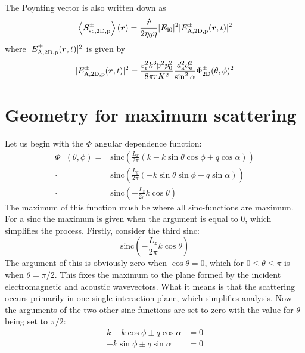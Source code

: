 \documentclass[11pt,twoside]{eitExjobb}
\begin{document}
	The Poynting vector is also written down as
	\begin{equation*}
		\left< \bm{S}_{\mathrm{sc,2D,p}}^\pm \right> (\bm{r}) = \frac{\bm{\hat{r}}}{2\eta_0 \eta} |\bm{E}_{\mathrm{i}0}|^2 |E_{\mathrm{A,2D,p}}^\pm (\bm{r},t)|^2
	\end{equation*}
	where $|E_{\mathrm{A,2D,p}}^\pm (\bm{r},t)|^2$ is given by
	\begin{equation*}
		|E_{\mathrm{A,2D,p}}^\pm (\bm{r},t)|^2 = \frac{\varepsilon_{\mathrm{r}}^2 k^3 \mathfrak{p}^2 p_0^2}{8\pi r K^2} \frac{d_{\mathrm{a}}^2 d_{\mathrm{e}}^2}{\sin^2{\alpha}} \Phi_{\mathrm{2D}}^\pm (\theta,\phi)^2
	\end{equation*}
	
	\section{Geometry for maximum scattering \label{sec:app-derivations-bragg}}
	Let us begin with the $\Phi$ angular dependence function:
	\begin{equation*}
	\begin{split}
		\Phi^\pm(\theta,\phi) =& \text{sinc} \left( \frac{L_{x}}{2\pi} \left( k - k\sin{\theta}\cos{\phi} \pm q\cos{\alpha} \right) \right) \\
		\cdot& \text{sinc} \left( \frac{L_{y}}{2\pi} \left( -k\sin{\theta}\sin{\phi} \pm q\sin{\alpha} \right) \right) \\
		\cdot& \text{sinc} \left( -\frac{L_{z}}{2\pi} k\cos{\theta} \right)
	\end{split}
	\end{equation*}
	The maximum of this function mush be where all sinc-functions are maximum. For a sinc the maximum is given when the argument is equal to 0, which simplifies the process. Firstly, consider the third sinc:
	\begin{equation*}
		\text{sinc} \left( -\frac{L_{z}}{2\pi} k\cos{\theta} \right)
	\end{equation*}
	The argument of this is obviously zero when $\cos{\theta} = 0$, which for $0 \leq \theta \leq \pi$ is when $\theta = \pi/2$. This fixes the maximum to the plane formed by the incident electromagnetic and acoustic wavevectors. What it means is that the scattering occurs primarily in one single interaction plane, which simplifies analysis. Now the arguments of the two other sinc functions are set to zero with the value for $\theta$ being set to $\pi/2$:
	\begin{align}
		k - k\cos{\phi} \pm q\cos{\alpha} &= 0 \label{eq:app-bragg-sinc1} \\
		-k\sin{\phi} \pm q\sin{\alpha} &= 0 \label{eq:app-bragg-sinc2}
	\end{align}
	
\end{document}
